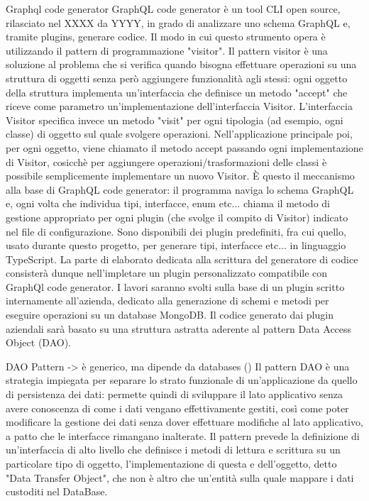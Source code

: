     Graphql code generator
        GraphQL code generator è un tool CLI open source, rilasciato nel XXXX da YYYY, in grado di analizzare uno schema GraphQL e, tramite plugins, generare codice.
        Il modo in cui questo strumento opera è utilizzando il pattern di programmazione "visitor".
        Il pattern visitor è una soluzione al problema che si verifica quando bisogna effettuare operazioni su una struttura di oggetti senza però aggiungere funzionalità agli stessi:
        ogni oggetto della struttura implementa un'interfaccia che definisce un metodo "accept" che riceve come parametro un'implementazione dell'interfaccia Visitor.
        L'interfaccia Visitor specifica invece un metodo "visit" per ogni tipologia (ad esempio, ogni classe) di oggetto sul quale svolgere operazioni.
        Nell'applicazione principale poi, per ogni oggetto, viene chiamato il metodo accept passando ogni implementazione di Visitor, cosicchè per aggiungere operazioni/trasformazioni delle classi è possibile semplicemente implementare un nuovo Visitor.
        È questo il meccanismo alla base di GraphQL code generator: il programma naviga lo schema GraphQL e, ogni volta che individua tipi, interfacce, enum etc... chiama il metodo di gestione appropriato per ogni plugin (che svolge il compito di Visitor) indicato nel file di configurazione.
        Sono disponibili dei plugin predefiniti, fra cui quello, usato durante questo progetto, per generare tipi, interfacce etc... in linguaggio TypeScript.
        La parte di elaborato dedicata alla scrittura del generatore di codice consisterà dunque nell'impletare un plugin personalizzato compatibile con GraphQl code generator.
        I lavori saranno svolti sulla base di un plugin scritto internamente all'azienda, dedicato alla generazione di schemi e metodi per eseguire operazioni su un database MongoDB.
        Il codice generato dai plugin aziendali sarà basato su una struttura astratta aderente al pattern Data Access Object (DAO).

    DAO Pattern -> è generico, ma dipende da databases ()
        Il pattern DAO è una strategia impiegata per separare lo strato funzionale di un'applicazione da quello di persistenza dei dati: permette quindi di sviluppare il lato applicativo senza avere conoscenza di come i dati vengano effettivamente gestiti, così come poter modificare la gestione dei dati
        senza dover effettuare modifiche al lato applicativo, a patto che le interfacce rimangano inalterate.
        Il pattern prevede la definizione di un'interfaccia di alto livello che definisce i metodi di lettura e scrittura su un particolare tipo di oggetto, l'implementazione di questa e dell'oggetto, detto "Data Transfer Object", che non è altro che un'entità sulla quale mappare i dati custoditi nel DataBase.
        

